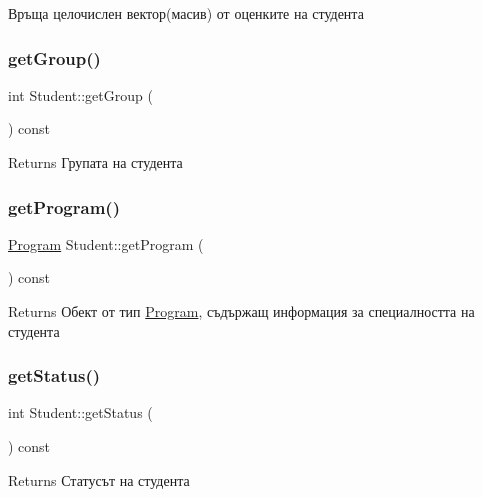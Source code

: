 Връща целочислен вектор(масив) от оценките на студента 

\mbox{\label{class_student_aa577682ad72c80d77524adada6d99ad2}} 
\subsubsection{\texorpdfstring{get\+Group()}{getGroup()}}
{\footnotesize\ttfamily int Student\+::get\+Group (\begin{DoxyParamCaption}{ }\end{DoxyParamCaption}) const}

\begin{DoxyReturn}{Returns}
Групата на студента 
\end{DoxyReturn}
\mbox{\label{class_student_a8cbf8bfe97a658ed07f67c6698aee6bb}} 
\subsubsection{\texorpdfstring{get\+Program()}{getProgram()}}
{\footnotesize\ttfamily \hyperlink{class_program}{Program} Student\+::get\+Program (\begin{DoxyParamCaption}{ }\end{DoxyParamCaption}) const}

\begin{DoxyReturn}{Returns}
Обект от тип \hyperlink{class_program}{Program}, съдържащ информация за специалността на студента 
\end{DoxyReturn}
\mbox{\label{class_student_a21b27deb99516d176ba91139227662b8}} 
\subsubsection{\texorpdfstring{get\+Status()}{getStatus()}}
{\footnotesize\ttfamily int Student\+::get\+Status (\begin{DoxyParamCaption}{ }\end{DoxyParamCaption}) const}

\begin{DoxyReturn}{Returns}
Статусът на студента 
\end{DoxyReturn}
\mbox{\label{class_student_a66cafd1014d34eea4eb9c0e644a0b825}} 
